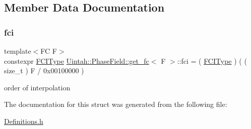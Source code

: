 \subsection{Member Data Documentation}
\mbox{\label{structUintah_1_1PhaseField_1_1get__fc_af33cbd8423c89349aa148f6ef1d48012}} 
\subsubsection{\texorpdfstring{fci}{fci}}
{\footnotesize\ttfamily template$<$FC F$>$ \\
constexpr \hyperlink{namespaceUintah_1_1PhaseField_a547ce3002aa97fbd3ef3192a6eec8406}{F\+C\+I\+Type} \hyperlink{structUintah_1_1PhaseField_1_1get__fc}{Uintah\+::\+Phase\+Field\+::get\+\_\+fc}$<$ F $>$\+::fci = ( \hyperlink{namespaceUintah_1_1PhaseField_a547ce3002aa97fbd3ef3192a6eec8406}{F\+C\+I\+Type} ) ( ( size\+\_\+t ) F / 0x00100000 )\hspace{0.3cm}{\ttfamily [static]}}



order of interpolation 



The documentation for this struct was generated from the following file\+:\begin{DoxyCompactItemize}
\item 
\hyperlink{Definitions_8h}{Definitions.\+h}\end{DoxyCompactItemize}
